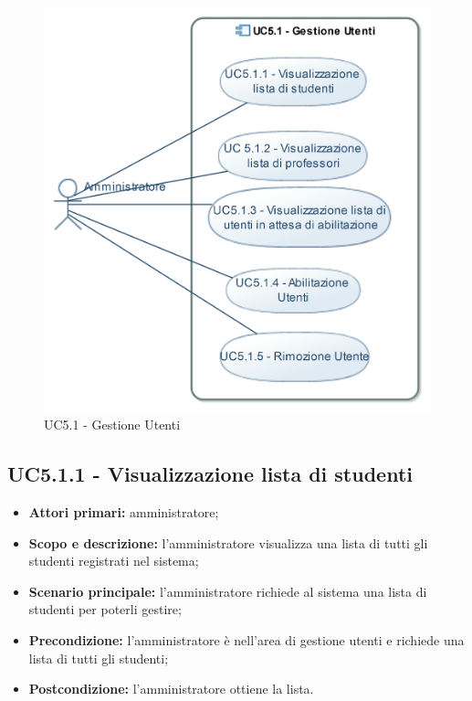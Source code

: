 \documentclass[AnalisiDeiRequisiti.tex]{subfiles}
\begin{document}
\begin{figure}[H]
	\centering
	\includegraphics[width=1.0\linewidth]{UC5_1.jpg}
	\caption{UC5.1 - Gestione Utenti}
	\label{fig:UC5.1 - Gestione Utenti}
\end{figure}

\subsection{UC5.1.1 - Visualizzazione lista di studenti}
\begin{itemize}
	\item \textbf{Attori primari:} amministratore;
	\item \textbf{Scopo e descrizione:} l'amministratore visualizza una lista di tutti gli studenti registrati nel sistema;
	\item \textbf{Scenario principale:} l'amministratore richiede al sistema una lista di studenti per poterli gestire;
	\item \textbf{Precondizione:} l'amministratore è nell'area di gestione utenti e richiede una lista di tutti gli studenti; 
	\item \textbf{Postcondizione:} l'amministratore ottiene la lista.
\end{itemize}
\end{document}
